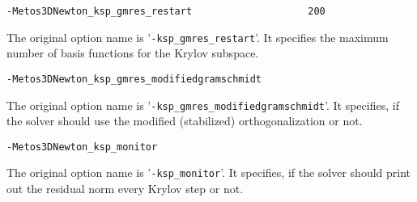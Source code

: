 \documentclass{article}
\begin{document}
\begin{verbatim}
-Metos3DNewton_ksp_gmres_restart                    200
\end{verbatim}
The original option name is '\texttt{-ksp\_gmres\_restart}'.
It specifies the maximum number of basis functions for the Krylov subspace.

\begin{verbatim}
-Metos3DNewton_ksp_gmres_modifiedgramschmidt
\end{verbatim}
The original option name is '\texttt{-ksp\_gmres\_modifiedgramschmidt}'.
It specifies, if the solver should use the modified (stabilized) orthogonalization or not.

\begin{verbatim}
-Metos3DNewton_ksp_monitor
\end{verbatim}
The original option name is '\texttt{-ksp\_monitor}'.
It specifies,
if the solver should print out the residual norm every Krylov step or not.

%
%

%

\end{document}
